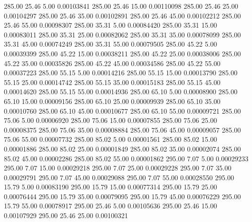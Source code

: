     285.00     25.46      5.00     0.00103841
    285.00     25.46     15.00     0.00110098
    285.00     25.46     25.00     0.00104297
    285.00     25.46     35.00     0.00102891
    285.00     25.46     45.00     0.00102212
    285.00     25.46     55.00     0.00098307
    285.00     35.31      5.00     0.00084420
    285.00     35.31     15.00     0.00083011
    285.00     35.31     25.00     0.00082062
    285.00     35.31     35.00     0.00078099
    285.00     35.31     45.00     0.00074249
    285.00     35.31     55.00     0.00079505
    285.00     45.22      5.00     0.00039399
    285.00     45.22     15.00     0.00038211
    285.00     45.22     25.00     0.00038006
    285.00     45.22     35.00     0.00035826
    285.00     45.22     45.00     0.00034586
    285.00     45.22     55.00     0.00037223
    285.00     55.15      5.00     0.00014216
    285.00     55.15     15.00     0.00013790
    285.00     55.15     25.00     0.00014742
    285.00     55.15     35.00     0.00015183
    285.00     55.15     45.00     0.00014620
    285.00     55.15     55.00     0.00014936
    285.00     65.10      5.00     0.00008900
    285.00     65.10     15.00     0.00009156
    285.00     65.10     25.00     0.00009939
    285.00     65.10     35.00     0.00010760
    285.00     65.10     45.00     0.00010677
    285.00     65.10     55.00     0.00009721
    285.00     75.06      5.00     0.00006920
    285.00     75.06     15.00     0.00007855
    285.00     75.06     25.00     0.00008375
    285.00     75.06     35.00     0.00008884
    285.00     75.06     45.00     0.00009057
    285.00     75.06     55.00     0.00007732
    285.00     85.02      5.00     0.00001561
    285.00     85.02     15.00     0.00001886
    285.00     85.02     25.00     0.00001849
    285.00     85.02     35.00     0.00002074
    285.00     85.02     45.00     0.00002286
    285.00     85.02     55.00     0.00001862
    295.00      7.07      5.00     0.00029233
    295.00      7.07     15.00     0.00029218
    295.00      7.07     25.00     0.00029228
    295.00      7.07     35.00     0.00029791
    295.00      7.07     45.00     0.00029088
    295.00      7.07     55.00     0.00028550
    295.00     15.79      5.00     0.00083190
    295.00     15.79     15.00     0.00077314
    295.00     15.79     25.00     0.00076444
    295.00     15.79     35.00     0.00079095
    295.00     15.79     45.00     0.00076229
    295.00     15.79     55.00     0.00078917
    295.00     25.46      5.00     0.00105636
    295.00     25.46     15.00     0.00107929
    295.00     25.46     25.00     0.00100321
